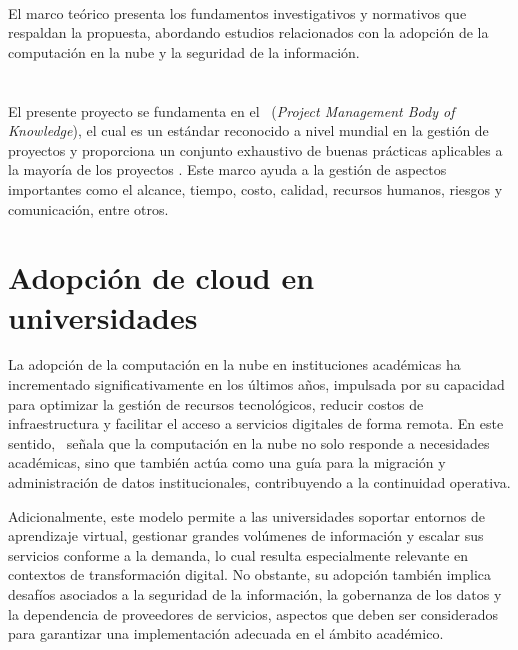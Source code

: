 \label{cap:marcoTeorico}
\mbox{}\\
\noindent
El marco teórico presenta los fundamentos investigativos y normativos que respaldan la propuesta, abordando estudios relacionados con
la adopción de la computación en la nube y la seguridad de la información.


\section{\PMBOK}
\noindent
El presente proyecto se fundamenta en el \PMBOK~(\textit{Project Management Body of Knowledge}), el cual es un estándar reconocido a nivel 
mundial en la gestión de proyectos y proporciona un conjunto exhaustivo de buenas prácticas aplicables a la mayoría de los proyectos 
\citep{PMI2019}. Este marco ayuda a la gestión de aspectos importantes como el alcance, tiempo, costo, calidad, recursos humanos, 
riesgos y comunicación, entre otros.

\section{Adopción de cloud en universidades}
\noindent
La adopción de la computación en la nube en instituciones académicas ha incrementado significativamente en los últimos años, impulsada
por su capacidad para optimizar la gestión de recursos tecnológicos, reducir costos de infraestructura y facilitar el acceso a 
servicios digitales de forma remota. En este sentido,~\cite{aydin2021cloud} señala que la computación en la nube no solo responde a 
necesidades académicas, sino que también actúa como una guía para la migración y administración de datos institucionales, 
contribuyendo a la continuidad operativa.

Adicionalmente, este modelo permite a las universidades soportar entornos de aprendizaje virtual, gestionar grandes volúmenes de 
información y escalar sus servicios conforme a la demanda, lo cual resulta especialmente relevante en contextos de transformación 
digital. No obstante, su adopción también implica desafíos asociados a la seguridad de la información, la gobernanza de los datos y 
la dependencia de proveedores de servicios, aspectos que deben ser considerados para garantizar una implementación adecuada en el 
ámbito académico.

